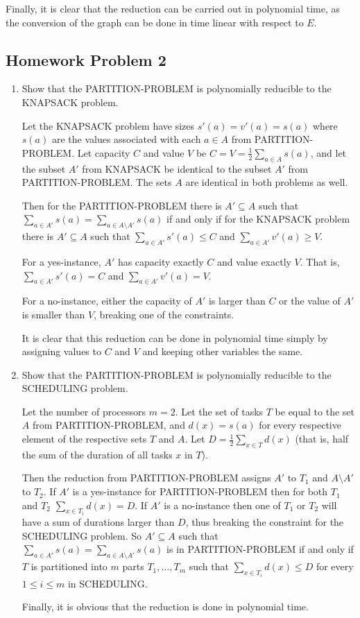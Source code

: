 \documentclass[a4paper]{article}
\begin{document}
Finally, it is clear that the reduction can be carried out in polynomial time,
as the conversion of the graph can be done in time linear with respect to $E$.

\subsection*{Homework Problem 2}

\begin{enumerate}[label=(\alph*)]
	\item Show that the PARTITION-PROBLEM is polynomially reducible to the
		KNAPSACK problem.

		Let the KNAPSACK problem have sizes $s'(a) = v'(a) = s(a)$ where $s(a)$
		are the values associated with each $a \in A$ from PARTITION-PROBLEM.
		Let capacity $C$ and value $V$ be $C = V = \frac{1}{2}\sum_{a\in A} s(a)$,
		and let the subset $A'$ from KNAPSACK be identical to the subset $A'$
		from PARTITION-PROBLEM. The sets $A$ are identical in both problems
		as well.

		Then for the PARTITION-PROBLEM there is $A' \subseteq A$ such that \\
		$\sum_{a \in A'} s(a) = \sum_{a \in A \setminus A'} s(a)$ if and only if
		for the KNAPSACK problem there is $A' \subseteq A$ such that
		$\sum_{a \in A'} s'(a) \leq C$ and $\sum_{a \in A'} v'(a) \geq V$.

		For a yes-instance, $A'$ has capacity exactly $C$ and value exactly $V$.
		That is, $\sum_{a \in A'} s'(a) = C$ and $\sum_{a \in A'} v'(a) = V$.
		
		For a no-instance, either the capacity of $A'$ is larger than $C$ or
		the value of $A'$ is smaller than $V$, breaking one of the constraints.
		
		It is clear that this reduction can be done in polynomial time simply
		by assigning values to $C$ and $V$ and keeping other variables the same.

	\item Show that the PARTITION-PROBLEM is polynomially reducible to the
		SCHEDULING problem.

		Let the number of processors $m = 2$. Let the set of tasks $T$ be equal
		to the set $A$ from PARTITION-PROBLEM, and $d(x) = s(a)$ for every
		respective element of the respective sets $T$ and $A$.
		Let $D = \frac{1}{2} \sum_{x \in T} d(x)$ (that is, half the sum of the
		duration of all tasks $x$ in $T$). 

		Then the reduction from PARTITION-PROBLEM assigns $A'$ to $T_1$ and
		$A \setminus A'$ to $T_2$. If $A'$ is a yes-instance for
		PARTITION-PROBLEM then for both $T_1$ and $T_2$ $\sum_{x \in T_i} d(x)
		= D$. If $A'$ is a no-instance then one of $T_1$ or $T_2$ will have
		a sum of durations larger than $D$, thus breaking the constraint for the
		SCHEDULING problem. So $A' \subseteq A$ such that $\sum_{a \in A'} s(a)
		= \sum_{a \in A \setminus A'} s(a)$ is in PARTITION-PROBLEM if and only
		if $T$ is partitioned into $m$ parts $T_1, \ldots, T_m$ such that
		$\sum_{x \in T_i} d(x) \leq D$ for every $1 \leq i \leq m$ in SCHEDULING.

		Finally, it is obvious that the reduction is done in polynomial time.

\end{enumerate}
\end{document}
